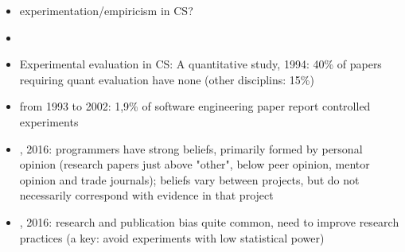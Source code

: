 \begin{itemize}
\item experimentation/empiricism in CS?
\item {}
\item Experimental evaluation in CS: A quantitative study, 1994: 40\% of papers requiring quant evaluation have none (other disciplins: 15\%)
\item {} from 1993 to 2002: 1,9\% of software engineering paper report controlled experiments
\item {}, 2016: programmers have strong beliefs, primarily formed by personal opinion (research papers just above "other", below peer opinion, mentor opinion and trade journals); beliefs vary between projects, but do not necessarily correspond with evidence in that project
\item {}, 2016: research and publication bias quite common, need to improve research practices (a key: avoid experiments with low statistical power)
\end{itemize}


















